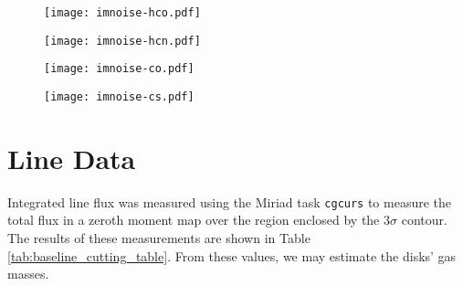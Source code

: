 



\begin{figure}
  \centering
  \begin{minipage}{.48\textwidth}
    \centering
    \texttt{[image: imnoise-hco.pdf]}
    \label{fig:noise-profile_hco}
  \end{minipage}%
  \begin{minipage}{.48\textwidth}
    \centering
    \texttt{[image: imnoise-hcn.pdf]}
    \label{fig:noise-profile_hcn}
  \end{minipage}%
  \par\medskip
  \begin{minipage}{.48\textwidth}
    \centering
    \texttt{[image: imnoise-co.pdf]}
    \label{fig:noise-profile_co}
  \end{minipage}%
  \begin{minipage}{.48\textwidth}
    \centering
    \texttt{[image: imnoise-cs.pdf]}
    \label{fig:noise-profile_cs}
  \end{minipage}
  \label{fig:noise-profiles}
\end{figure}








\section{Line Data}
\label{section:line_data}


Integrated line flux was measured using the Miriad task \texttt{cgcurs} to measure the total flux in a zeroth moment map over the region enclosed by the 3$\sigma$ contour. The results of these measurements are shown in Table \ref{tab:baseline_cutting_table}. From these values, we may estimate the disks' gas masses.


